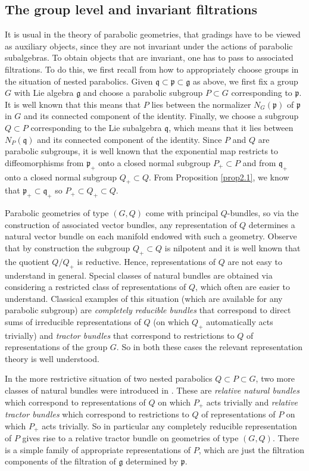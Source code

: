 \documentclass[10pt,a4paper]{amsart}
\numberwithin{equation}{section}
\def\frak{\mathfrak}
\begin{document}
\subsection{The group level and invariant filtrations}\label{2.2}
It is usual in the theory of parabolic geometries, that gradings have to be viewed as
auxiliary objects, since they are not invariant under the actions of parabolic
subalgebras. To obtain objects that are invariant, one has to pass to associated
filtrations. To do this, we first recall from \cite{Rel-BGG1} how to appropriately
choose groups in the situation of nested parabolics. Given
$\frak q\subset\frak p\subset\frak g$ as above, we first fix a group $G$ with Lie
algebra $\frak g$ and choose a parabolic subgroup $P\subset G$ corresponding to
$\frak p$. It is well known that this means that $P$ lies between the normalizer
$N_G(\frak p)$ of $\frak p$ in $G$ and its connected component of the
identity. Finally, we choose a subgroup $Q\subset P$ corresponding to the Lie
subalgebra $\frak q$, which means that it lies between $N_P(\frak q)$ and its
connected component of the identity. Since $P$ and $Q$ are parabolic subgroups, it is
well known that the exponential map restricts to diffeomorphisms from $\frak p_+$
onto a closed normal subgroup $P_+\subset P$ and from $\frak q_+$ onto a closed
normal subgroup $Q_+\subset Q$. From Proposition \ref{prop2.1}, we know that
$\frak p_+\subset\frak q_+$ so $P_+\subset Q_+\subset Q$.

Parabolic geometries of type $(G,Q)$ come with principal $Q$-bundles, so via the
construction of associated vector bundles, any representation of $Q$ determines a
natural vector bundle on each manifold endowed with such a geometry. Observe that by
construction the subgroup $Q_+\subset Q$ is nilpotent and it is well known that the
quotient $Q/Q_+$ is reductive. Hence, representations of $Q$ are not easy to
understand in general. Special classes of natural bundles are obtained via
considering a restricted class of representations of $Q$, which often are easier to
understand. Classical examples of this situation (which are available for any
parabolic subgroup) are \textit{completely reducible bundles} that correspond to
direct sums of irreducible representations of $Q$ (on which $Q_+$ automatically acts
trivially) and \textit{tractor bundles} that correspond to restrictions to $Q$ of
representations of the group $G$. So in both these cases the relevant representation
theory is well understood.

In the more restrictive situation of two nested parabolics $Q\subset P\subset G$, two
more classes of natural bundles were introduced in
\cite[Definition 2.1]{Rel-BGG2}. These are \textit{relative natural bundles} which correspond to
representations of $Q$ on which $P_+$ acts trivially and \textit{relative tractor
 bundles} which correspond to restrictions to $Q$ of representations of $P$ on which
$P_+$ acts trivially. So in particular any completely reducible representation of $P$
gives rise to a relative tractor bundle on geometries of type $(G,Q)$. There is a
simple family of appropriate representations of $P$, which are just the filtration
components of the filtration of $\frak g$ determined by $\frak p$.
\end{document}
